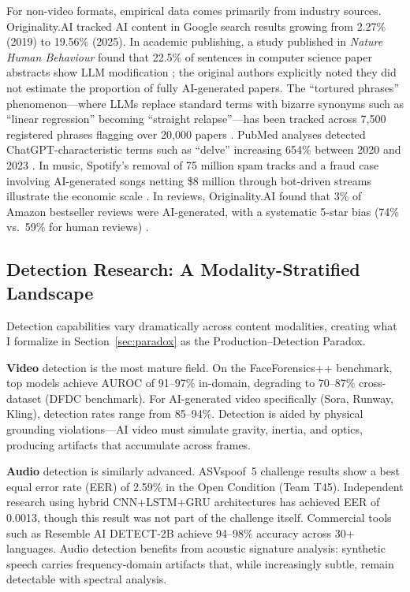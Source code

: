 \documentclass[12pt,a4paper]{article}
\begin{document}
For non-video formats, empirical data comes primarily from industry sources. Originality.AI tracked AI content in Google search results growing from 2.27\% (2019) to 19.56\% (2025). In academic publishing, a study published in \textit{Nature Human Behaviour} found that 22.5\% of sentences in computer science paper abstracts show LLM modification \parencite{Liang2025}; the original authors explicitly noted they did not estimate the proportion of fully AI-generated papers. The ``tortured phrases'' phenomenon---where LLMs replace standard terms with bizarre synonyms such as ``linear regression'' becoming ``straight relapse''---has been tracked across 7,500 registered phrases flagging over 20,000 papers \parencite{ProblematicPaperScreener2025}. PubMed analyses detected ChatGPT-characteristic terms such as ``delve'' increasing 654\% between 2020 and 2023 \parencite{SciAm2026}. In music, Spotify's removal of 75 million spam tracks and a fraud case involving AI-generated songs netting \$8 million through bot-driven streams illustrate the economic scale \parencite{Time2026}. In reviews, Originality.AI found that 3\% of Amazon bestseller reviews were AI-generated, with a systematic 5-star bias (74\% vs.\ 59\% for human reviews) \parencite{OriginalityAI2025b}.

\subsection{Detection Research: A Modality-Stratified Landscape}

Detection capabilities vary dramatically across content modalities, creating what I formalize in Section~\ref{sec:paradox} as the Production--Detection Paradox.

\textbf{Video} detection is the most mature field. On the FaceForensics++ benchmark, top models achieve AUROC of 91--97\% in-domain, degrading to 70--87\% cross-dataset (DFDC benchmark). For AI-generated video specifically (Sora, Runway, Kling), detection rates range from 85--94\%. Detection is aided by physical grounding violations---AI video must simulate gravity, inertia, and optics, producing artifacts that accumulate across frames.

\textbf{Audio} detection is similarly advanced. ASVspoof~5 challenge results show a best equal error rate (EER) of 2.59\% in the Open Condition (Team T45). Independent research using hybrid CNN+LSTM+GRU architectures has achieved EER of 0.0013, though this result was not part of the challenge itself. Commercial tools such as Resemble AI DETECT-2B achieve 94--98\% accuracy across 30+ languages. Audio detection benefits from acoustic signature analysis: synthetic speech carries frequency-domain artifacts that, while increasingly subtle, remain detectable with spectral analysis.
\end{document}
